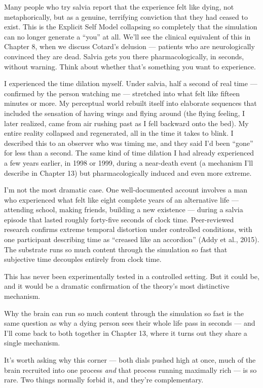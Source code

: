 \documentclass[11pt, twoside, openright]{book}
\begin{document}
Many people who try salvia report that the experience felt like dying, not metaphorically, but as a genuine, terrifying conviction that they had ceased to exist. This is the Explicit Self Model collapsing so completely that the simulation can no longer generate a ``you'' at all. We'll see the clinical equivalent of this in Chapter 8, when we discuss Cotard's delusion --- patients who are neurologically convinced they are dead. Salvia gets you there pharmacologically, in seconds, without warning. Think about whether that's something you want to experience.

I experienced the time dilation myself. Under salvia, half a second of real time --- confirmed by the person watching me --- stretched into what felt like fifteen minutes or more. My perceptual world rebuilt itself into elaborate sequences that included the sensation of having wings and flying around (the flying feeling, I later realized, came from air rushing past as I fell backward onto the bed). My entire reality collapsed and regenerated, all in the time it takes to blink. I described this to an observer who was timing me, and they said I'd been ``gone'' for less than a second. The same kind of time dilation I had already experienced a few years earlier, in 1998 or 1999, during a near-death event (a mechanism I'll describe in Chapter 13) but pharmacologically induced and even more extreme.

I'm not the most dramatic case. One well-documented account involves a man who experienced what felt like eight complete years of an alternative life --- attending school, making friends, building a new existence --- during a salvia episode that lasted roughly forty-five seconds of clock time. Peer-reviewed research confirms extreme temporal distortion under controlled conditions, with one participant describing time as ``creased like an accordion'' (Addy et al., 2015). The substrate runs so much content through the simulation so fast that subjective time decouples entirely from clock time.

This has never been experimentally tested in a controlled setting. But it could be, and it would be a dramatic confirmation of the theory's most distinctive mechanism.

Why the brain can run so much content through the simulation so fast is the same question as why a dying person sees their whole life pass in seconds --- and I'll come back to both together in Chapter 13, where it turns out they share a single mechanism.

It's worth asking why this corner --- both dials pushed high at once, much of the brain recruited into one process \textit{and} that process running maximally rich --- is so rare. Two things normally forbid it, and they're complementary.
\end{document}
